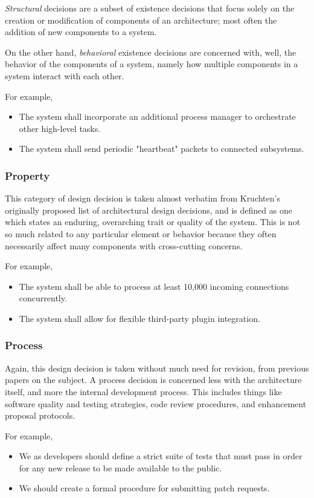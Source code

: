 \documentclass[a4paper, 12pt]{article}
\begin{document}
			\textit{Structural} decisions are a subset of existence decisions that focus solely on the creation or modification of components of an architecture; most often the addition of new components to a system.
			
			On the other hand, \textit{behavioral} existence decisions are concerned with, well, the behavior of the components of a system, namely how multiple components in a system interact with each other.
			
			For example,
			\begin{itemize}
				\item The system shall incorporate an additional process manager to orchestrate other high-level tasks.
				\item The system shall send periodic "heartbeat" packets to connected subsystems.
			\end{itemize}
		
		\subsubsection{\textbf{Property}}
			This category of design decision is taken almost verbatim from Kruchten's originally proposed list of architectural design decisions\cite{kruchten}, and is defined as one which states an enduring, overarching trait or quality of the system. This is not so much related to any particular element or behavior because they often necessarily affect many components with cross-cutting concerns.
			
			For example,
			\begin{itemize}
				\item The system shall be able to process at least 10,000 incoming connections concurrently.
				\item The system shall allow for flexible third-party plugin integration.
			\end{itemize}
		
		\subsubsection{\textbf{Process}}
			Again, this design decision is taken without much need for revision, from previous papers on the subject. A process decision is concerned less with the architecture itself, and more the internal development process. This includes things like software quality and testing strategies, code review procedures, and enhancement proposal protocols.
			
			For example,
			\begin{itemize}
				\item We as developers should define a strict suite of tests that must pass in order for any new release to be made available to the public.
				\item We should create a formal procedure for submitting patch requests.
			\end{itemize}
		
\end{document}
